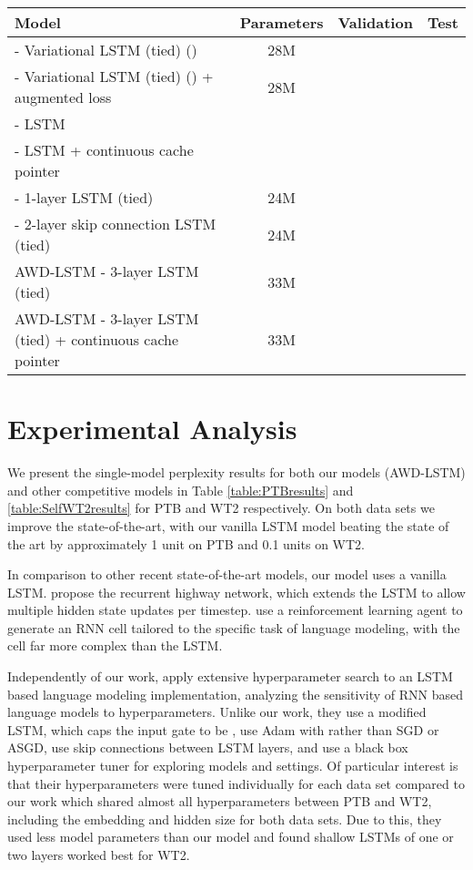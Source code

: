 \documentclass{article}
\begin{document}
\begin{table*}
\center
\begin{tabular}{l|ccc}
\toprule
\bf Model & \bf Parameters & \bf Validation &  \bf Test \\
\midrule
\citet{Inan2016} - Variational LSTM  (tied) () & 28M &  &  \\
\citet{Inan2016} - Variational LSTM  (tied) () + augmented loss & 28M &  &  \\
\citet{Grave2016} - LSTM &  &  &  \\
\citet{Grave2016} - LSTM + continuous cache pointer &  &  &  \\
\citet{Melis2017} - 1-layer LSTM (tied) & 24M &  &  \\
\citet{Melis2017} - 2-layer skip connection LSTM (tied) & 24M &  &  \\
\midrule
AWD-LSTM - 3-layer LSTM (tied) & 33M &  &  \\
\midrule
AWD-LSTM - 3-layer LSTM (tied) + continuous cache pointer & 33M &  &  \\
\bottomrule
\end{tabular}
\caption{Single model perplexity over WikiText-2.
Models noting \textit{tied} use weight tying on the embedding and softmax weights.
Our model, AWD-LSTM, stands for ASGD Weight-Dropped LSTM.
}
\label{table:SelfWT2results}
\end{table*}

\section{Experimental Analysis}

We present the single-model perplexity results for both our models (AWD-LSTM) and other competitive models in Table \ref{table:PTBresults} and \ref{table:SelfWT2results} for PTB and WT2 respectively.
On both data sets we improve the state-of-the-art, with our vanilla LSTM model beating the state of the art by approximately 1 unit on PTB and 0.1 units on WT2.

In comparison to other recent state-of-the-art models, our model uses a vanilla LSTM.
\citet{Zilly2016} propose the recurrent highway network, which extends the LSTM to allow multiple hidden state updates per timestep.
\citet{Zoph2016} use a reinforcement learning agent to generate an RNN cell tailored to the specific task of language modeling, with the cell far more complex than the LSTM.

Independently of our work, \citet{Melis2017} apply extensive hyperparameter search to an LSTM based language modeling implementation, analyzing the sensitivity of RNN based language models to hyperparameters.
Unlike our work, they use a modified LSTM, which caps the input gate  to be , use Adam with  rather than SGD or ASGD, use skip connections between LSTM layers, and use a black box hyperparameter tuner for exploring models and settings.
Of particular interest is that their hyperparameters were tuned individually for each data set compared to our work which shared almost all hyperparameters between PTB and WT2, including the embedding and hidden size for both data sets.
Due to this, they used less model parameters than our model and found shallow LSTMs of one or two layers worked best for WT2.
\end{document}
